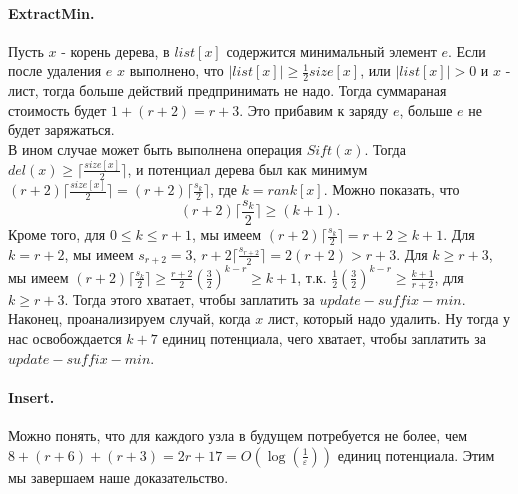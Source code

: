 \documentclass{article}
\begin{document}
		\paragraph{ExtractMin.} 
		Пусть $x$ - корень дерева, в $list[x]$ содержится минимальный элемент $e$. Если после удаления $e$ $x$ выполнено, что $|list[x]| \geq \frac{1}{2}size[x]$, или $|list[x]| > 0$ и $x$ - лист, тогда больше действий предпринимать не надо. Тогда суммараная стоимость будет $1 + (r+2) = r + 3$. Это прибавим к заряду $e$, больше $e$ не будет заряжаться.\\
		В ином случае может быть выполнена операция $Sift(x)$. Тогда $del(x) \geq \lceil \frac{size[x]}{2} \rceil$, и потенциал дерева был как минимум $(r+2)\lceil \frac{size[x]}{2} \rceil = (r+2)\lceil\frac{s_k}{2}\rceil$, где $k = rank[x]$. Можно показать, что 
		$$(r+2)\lceil\frac{s_k}{2}\rceil\geq(k+1).$$
		Кроме того, для $0\leq k\leq r+1$, мы имеем $(r+2)\lceil\frac{s_k}{2}\rceil = r+2\geq k+1$. Для $k = r + 2$, мы имеем $s_{r+2} = 3$, $r+2\lceil\frac{s_{r+2}}{2}\rceil = 2(r+2) > r + 3$. Для $k\geq r + 3$, мы имеем $(r+2)\lceil\frac{s_k}{2}\rceil \geq \frac{r+2}{2}(\frac{3}{2})^{k-r} \geq k+1$, т.к. $\frac{1}{2}(\frac{3}{2})^{k-r} \geq \frac{k+1}{r+2}$, для $k\geq r+3$. Тогда этого хватает, чтобы заплатить за $update-suffix-min$.\\
		Наконец, проанализируем случай, когда $x$ лист, который надо удалить. Ну тогда у нас освобождается $k+7$ единиц потенциала, чего хватает, чтобы заплатить за $update-suffix-min$.
		\paragraph{Insert.}
		Можно понять, что для каждого узла в будущем потребуется не более, чем $8 + (r+6) + (r+3) = 2r + 17 = O(\log(\frac{1}{\varepsilon}))$ единиц потенциала. Этим мы завершаем наше доказательство.
\end{document}
